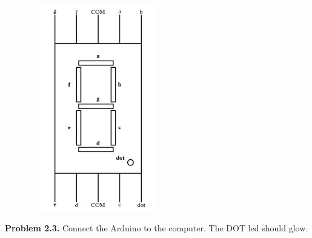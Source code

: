 \documentclass[journal,12pt,twocolumn]{IEEEtran}
\begin{document}
	\begin{figure}[!h]
		\begin{center}
		\includegraphics[width=6cm,height=9cm]{./sevenseg}
		\end{center}
		\caption{}
		\label{fig:sevenseg}
	\end{figure}

		\textbf{Problem 2.3.} Connect the Arduino to the computer. The DOT led should glow.
\end{document}
